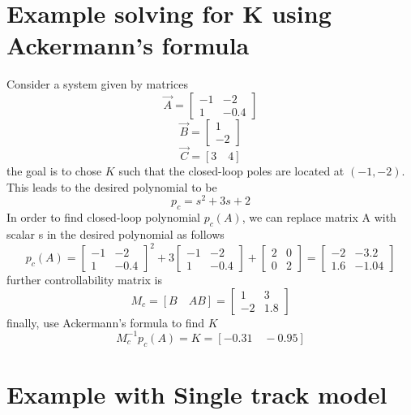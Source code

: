 \section{Example solving for K using Ackermann's formula}

Consider a system given by matrices 
$$ \vec{A} = \begin{bmatrix}
	-1 & -2 \\ 1 & -0.4
\end{bmatrix} $$
$$ \vec{B} = \begin{bmatrix}
1  \\ -2
\end{bmatrix} $$
$$ \vec{C} = [3 \quad 4] $$
the goal is to chose $K$ such that the closed-loop poles are located at $(-1, -2)$. This leads to the desired polynomial to be
$$ p_{c} = s^{2} + 3s + 2 $$
In order to find closed-loop polynomial $p_{c}(A)$, we can replace matrix A with scalar s in the desired polynomial as follows
\begin{equation}
	p_{c}(A) = \begin{bmatrix}
		-1 & -2 \\ 1 & -0.4
	\end{bmatrix}^{2} + 3 \begin{bmatrix}
	-1 & -2 \\ 1 & -0.4
	\end{bmatrix} + \begin{bmatrix}
	2 & 0 \\ 0 & 2
	\end{bmatrix} = \begin{bmatrix}
	-2 & -3.2 \\ 1.6 & -1.04
	\end{bmatrix}
\end{equation}
further controllability matrix is
\begin{equation}
	M_{c} = [B \quad AB] = \begin{bmatrix}
	1 & 3 \\ -2 & 1.8
	\end{bmatrix}
\end{equation}
finally, use Ackermann's formula to find $K$
\begin{equation}
	[0 \quad 1]M_{c}^{-1}p_{c}(A) = K = [-0.31 \quad -0.95]
\end{equation}

\section{Example with Single track model}

